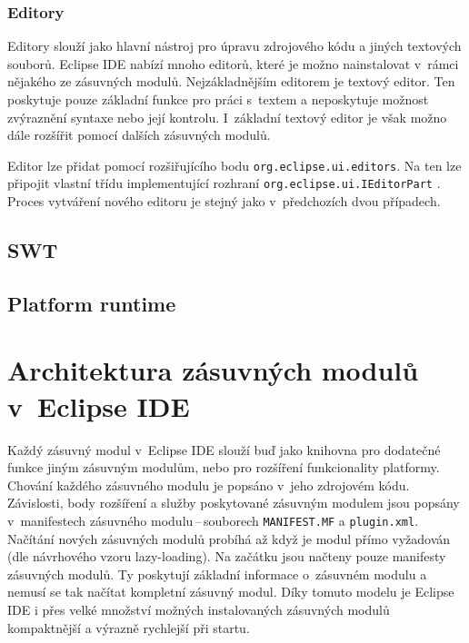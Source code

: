       \subsubsection{Editory}
      Editory slouží jako hlavní nástroj pro úpravu zdrojového kódu a jiných textových souborů. Eclipse IDE nabízí mnoho editorů, které je možno nainstalovat v~rámci nějakého ze zásuvných modulů. Nejzákladnějším editorem je textový editor. Ten poskytuje pouze základní funkce pro práci s~textem a neposkytuje možnost zvýraznění syntaxe nebo její kontrolu. I~základní textový editor je však možno dále rozšířit pomocí dalších zásuvných modulů.

      Editor lze přidat pomocí rozšiřujícího bodu \texttt{org.eclipse.ui.editors}. Na ten lze připojit vlastní třídu implementující rozhraní \texttt{org.eclipse.ui.IEditorPart} \cite{Plugins}. Proces vytváření nového editoru je stejný jako v~předchozích dvou případech.

    \subsection{SWT}
    
    \subsection{Platform runtime}

  \section{Architektura zásuvných modulů v~Eclipse IDE}
  Každý zásuvný modul v~Eclipse IDE slouží buď jako knihovna pro dodatečné funkce jiným zásuvným modulům, nebo pro rozšíření funkcionality platformy. Chování každého zásuvného modulu je popsáno v~jeho zdrojovém kódu. Závislosti, body rozšíření a služby poskytované  zásuvným modulem jsou popsány v~manifestech zásuvného modulu\,--\,souborech \texttt{MANIFEST.MF} a \texttt{plugin.xml}. Načítání nových zásuvných modulů probíhá až když je modul přímo vyžadován\,(dle návrhového vzoru lazy-loading). Na začátku jsou načteny pouze manifesty zásuvných modulů. Ty poskytují základní informace o~zásuvném modulu a nemusí se tak načítat kompletní zásuvný modul. Díky tomuto modelu je Eclipse IDE i přes velké množství možných instalovaných zásuvných modulů kompaktnější a výrazně rychlejší při startu.

